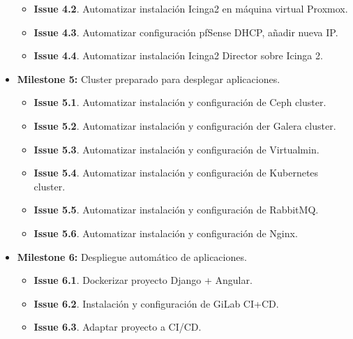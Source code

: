 \begin{text}
\begin{itemize}
\begin{itemize}
                                        \item \textbf{Issue 4.2}. Automatizar instalación Icinga2 en máquina virtual Proxmox.
                                        \item \textbf{Issue 4.3}. Automatizar configuración pfSense DHCP, añadir nueva IP.
                                        \item \textbf{Issue 4.4}. Automatizar instalación Icinga2 Director sobre Icinga 2.
                                \end{itemize}
                        \item \textbf{Milestone 5:} Cluster preparado para desplegar aplicaciones.
                                \begin{itemize}
                                        \item \textbf{Issue 5.1}. Automatizar instalación y configuración de Ceph cluster.
                                        \item \textbf{Issue 5.2}. Automatizar instalación y configuración der Galera cluster.
                                        \item \textbf{Issue 5.3}. Automatizar instalación y configuración de Virtualmin.
                                        \item \textbf{Issue 5.4}. Automatizar instalación y configuración de Kubernetes cluster.
                                        \item \textbf{Issue 5.5}. Automatizar instalación y configuración de RabbitMQ.
                                        \item \textbf{Issue 5.6}. Automatizar instalación y configuración de Nginx.
                                \end{itemize}
                        \item \textbf{Milestone 6:} Despliegue automático de aplicaciones.
                                \begin{itemize}
                                        \item \textbf{Issue 6.1}. Dockerizar proyecto Django + Angular.
                                        \item \textbf{Issue 6.2}. Instalación y configuración de GiLab CI+CD.
                                        \item \textbf{Issue 6.3}. Adaptar proyecto a CI/CD.
                                \end{itemize}
                \end{itemize}
        \end{text}

